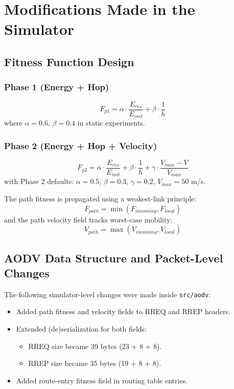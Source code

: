 \documentclass[12pt,a4paper]{article}
\begin{document}
\section{Modifications Made in the Simulator}

\subsection{Fitness Function Design}
\subsubsection*{Phase 1 (Energy + Hop)}
\begin{equation}
F_{p1} = \alpha \cdot \frac{E_{res}}{E_{init}} + \beta \cdot \frac{1}{h}
\end{equation}
where $\alpha=0.6$, $\beta=0.4$ in static experiments.

\subsubsection*{Phase 2 (Energy + Hop + Velocity)}
\begin{equation}
F_{p2} = \alpha \cdot \frac{E_{res}}{E_{init}} + \beta \cdot \frac{1}{h} + \gamma \cdot \frac{V_{max}-V}{V_{max}}
\end{equation}
with Phase 2 defaults: $\alpha=0.5$, $\beta=0.3$, $\gamma=0.2$, $V_{max}=50$ m/s.

The path fitness is propagated using a weakest-link principle:
\begin{equation}
F_{path} = \min(F_{incoming}, F_{local})
\end{equation}
and the path velocity field tracks worst-case mobility:
\begin{equation}
V_{path} = \max(V_{incoming}, V_{local})
\end{equation}

\subsection{AODV Data Structure and Packet-Level Changes}
The following simulator-level changes were made inside \texttt{src/aodv}:
\begin{itemize}[leftmargin=1.5em]
    \item Added path fitness and velocity fields to RREQ and RREP headers.
    \item Extended (de)serialization for both fields:
    \begin{itemize}[leftmargin=2em]
        \item RREQ size became 39 bytes (23 + 8 + 8).
        \item RREP size became 35 bytes (19 + 8 + 8).
    \end{itemize}
    \item Added route-entry fitness field in routing table entries.
\end{itemize}
\end{document}
